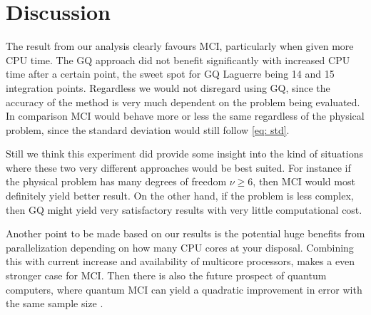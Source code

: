 \section{Discussion}
The result from our analysis clearly favours MCI, particularly when
given more CPU time. The GQ approach did not benefit significantly with
increased
CPU time after a certain point, the sweet spot for GQ Laguerre being 14 and 15
integration points. Regardless we would not disregard using GQ, since the
accuracy of the method is very much dependent on the problem being evaluated.
In comparison MCI would behave more or less the same regardless of the physical
problem, since the standard deviation would still follow \cref{eq: std}.

Still we think this experiment did provide some insight into the kind of
situations where
these two very different approaches would be best suited. For instance if the
physical problem has many degrees of freedom $\nu \ge 6 $, then MCI would most
definitely yield better result. On the other hand, if the problem is less complex,
then GQ might yield very satisfactory results with very little computational cost.

Another point to be made based on our results is the potential huge benefits
from parallelization depending on how many CPU cores at your disposal. Combining
this with current increase and availability of multicore processors, makes a
even stronger case for MCI.
Then there is also the future prospect of quantum
computers, where quantum MCI can yield a quadratic improvement in error with
the same sample size \parencite{doi:10.1098/rspa.2015.0301}.
